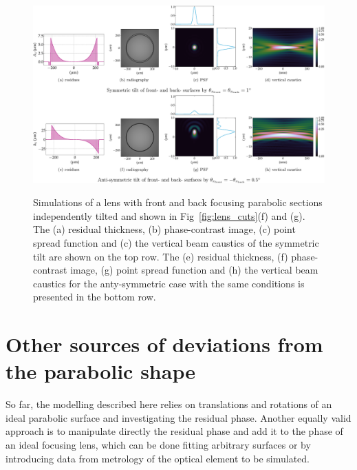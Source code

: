 \begin{refsection}
\begin{figure}[t]
        \centering
        {\includegraphics[width=1.\linewidth]{figures/ch04/tilt_fs_CRL.pdf}}
        \caption[Effects of the tilted parabolic section]{Simulations of a lens with front and back focusing parabolic sections independently tilted and shown in Fig~\ref{fig:lens_cuts}(f) and (g). The (a) residual thickness, (b) phase-contrast image, (c) point spread function and (c) the vertical beam caustics of the symmetric tilt are shown on the top row. The (e) residual thickness, (f) phase-contrast image, (g) point spread function and (h) the vertical beam caustics for the anty-symmetric case with the same conditions is presented in the bottom row.} \label{fig:tilt_fs_CRL}
\end{figure}
\section{Other sources of deviations from the parabolic shape}\label{sec:other_sources}

So far, the modelling described here relies on translations and rotations of an ideal parabolic surface and investigating the residual phase. Another equally valid approach is to manipulate directly the residual phase and add it to the phase of an ideal focusing lens, which can be done fitting arbitrary surfaces or by introducing data from metrology of the optical element to be simulated.


\end{refsection}

